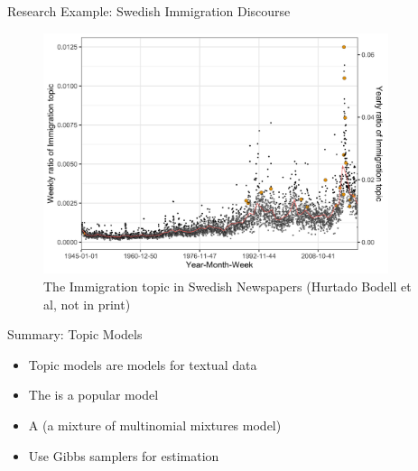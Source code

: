\documentclass[10pt]{beamer}
\begin{document}
\begin{frame}{Research Example: Swedish Immigration Discourse}

\begin{figure}[h]
\begin{center}
\includegraphics[width=0.9\textwidth]{fig/weekly_yearly_tot_outliers.png}
\caption{The Immigration topic in Swedish Newspapers (Hurtado Bodell et al, not in print)}
\end{center}
\end{figure}

\end{frame}


\begin{frame}{Summary: Topic Models}

\begin{itemize}
    \item Topic models are  models for textual data\pause
    \item The  is a popular model\pause
    \item A  (a mixture of multinomial mixtures model)\pause
    \item Use Gibbs samplers for estimation
\end{itemize}
\end{frame}
\end{document}
